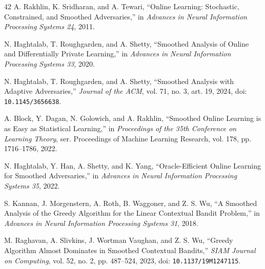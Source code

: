 \begin{thebibliography}{42}
A. Rakhlin, K. Sridharan, and A. Tewari, ``Online Learning: Stochastic, Constrained, and Smoothed Adversaries,'' in \emph{Advances in Neural Information Processing Systems 24}, 2011.

N. Haghtalab, T. Roughgarden, and A. Shetty, ``Smoothed Analysis of Online and Differentially Private Learning,'' in \emph{Advances in Neural Information Processing Systems 33}, 2020.

N. Haghtalab, T. Roughgarden, and A. Shetty, ``Smoothed Analysis with Adaptive Adversaries,'' \emph{Journal of the ACM}, vol. 71, no. 3, art. 19, 2024, doi: \nolinkurl{10.1145/3656638}.

A. Block, Y. Dagan, N. Golowich, and A. Rakhlin, ``Smoothed Online Learning is as Easy as Statistical Learning,'' in \emph{Proceedings of the 35th Conference on Learning Theory}, ser. Proceedings of Machine Learning Research, vol. 178, pp. 1716--1786, 2022.

N. Haghtalab, Y. Han, A. Shetty, and K. Yang, ``Oracle-Efficient Online Learning for Smoothed Adversaries,'' in \emph{Advances in Neural Information Processing Systems 35}, 2022.

S. Kannan, J. Morgenstern, A. Roth, B. Waggoner, and Z. S. Wu, ``A Smoothed Analysis of the Greedy Algorithm for the Linear Contextual Bandit Problem,'' in \emph{Advances in Neural Information Processing Systems 31}, 2018.

M. Raghavan, A. Slivkins, J. Wortman Vaughan, and Z. S. Wu, ``Greedy Algorithm Almost Dominates in Smoothed Contextual Bandits,'' \emph{SIAM Journal on Computing}, vol. 52, no. 2, pp. 487--524, 2023, doi: \nolinkurl{10.1137/19M1247115}.

\end{thebibliography}
\endgroup
